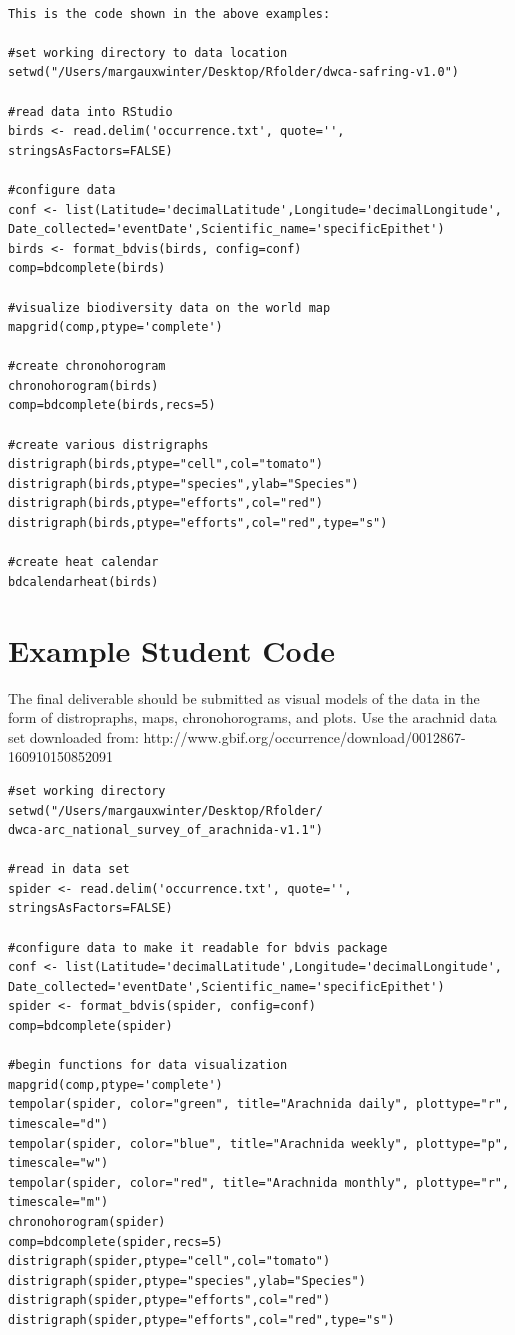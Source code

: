 \begin{lstlisting}

This is the code shown in the above examples:

#set working directory to data location
setwd("/Users/margauxwinter/Desktop/Rfolder/dwca-safring-v1.0")

#read data into RStudio
birds <- read.delim('occurrence.txt', quote='', stringsAsFactors=FALSE)

#configure data
conf <- list(Latitude='decimalLatitude',Longitude='decimalLongitude',
Date_collected='eventDate',Scientific_name='specificEpithet')
birds <- format_bdvis(birds, config=conf)
comp=bdcomplete(birds)

#visualize biodiversity data on the world map
mapgrid(comp,ptype='complete')

#create chronohorogram
chronohorogram(birds) 
comp=bdcomplete(birds,recs=5)

#create various distrigraphs
distrigraph(birds,ptype="cell",col="tomato") 
distrigraph(birds,ptype="species",ylab="Species") 
distrigraph(birds,ptype="efforts",col="red") 
distrigraph(birds,ptype="efforts",col="red",type="s") 

#create heat calendar
bdcalendarheat(birds) 
\end{lstlisting}

\section{Example Student Code}

The final deliverable should be submitted as visual models of the data in the form of distropraphs, maps, chronohorograms, and plots. Use the arachnid data set downloaded from: http://www.gbif.org/occurrence/download/0012867-160910150852091

\begin{lstlisting}
#set working directory
setwd("/Users/margauxwinter/Desktop/Rfolder/
dwca-arc_national_survey_of_arachnida-v1.1")

#read in data set
spider <- read.delim('occurrence.txt', quote='', stringsAsFactors=FALSE)

#configure data to make it readable for bdvis package
conf <- list(Latitude='decimalLatitude',Longitude='decimalLongitude',
Date_collected='eventDate',Scientific_name='specificEpithet')
spider <- format_bdvis(spider, config=conf)
comp=bdcomplete(spider)

#begin functions for data visualization
mapgrid(comp,ptype='complete')
tempolar(spider, color="green", title="Arachnida daily", plottype="r", timescale="d") 
tempolar(spider, color="blue", title="Arachnida weekly", plottype="p", timescale="w") 
tempolar(spider, color="red", title="Arachnida monthly", plottype="r", timescale="m") 
chronohorogram(spider) 
comp=bdcomplete(spider,recs=5)
distrigraph(spider,ptype="cell",col="tomato") 
distrigraph(spider,ptype="species",ylab="Species") 
distrigraph(spider,ptype="efforts",col="red") 
distrigraph(spider,ptype="efforts",col="red",type="s") 
\end{lstlisting}

